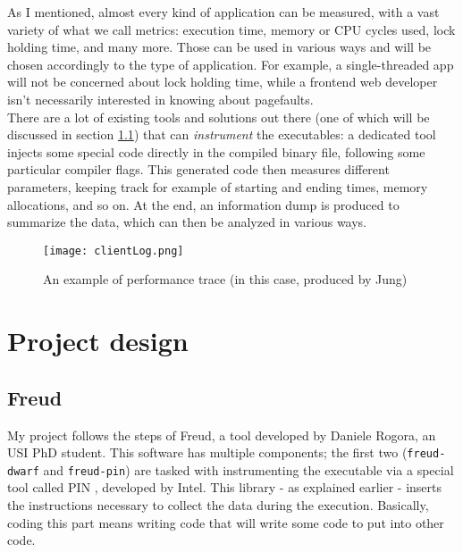     As I mentioned, almost every kind of application can be measured, with a vast variety of what we call metrics:
    execution time, memory or CPU cycles used, lock holding time, and many more. Those can be used in
    various ways and will be chosen accordingly to the type of application. For example, a single-threaded app
    will not be concerned about lock holding time, while a frontend web developer isn't 
    necessarily interested in knowing about pagefaults.\\

    There are a lot of existing tools and solutions out there (one of which will be discussed in section \ref{sec:freud})
    that can \textit{instrument} the executables: a dedicated tool injects some special code directly in the compiled
    binary file, following some particular compiler flags. This generated code then measures
    different parameters, keeping track for example of starting and ending times, memory allocations, and so on.
    At the end, an information dump is produced to summarize the data, which can then be analyzed in various ways.\\

    \begin{figure}[H]
        \centering
        \texttt{[image: clientLog.png]}
        \caption{An example of performance trace (in this case, produced by Jung)}
        \label{fig:clientLog}
    \end{figure}


\chapter{Project design}

    \section{Freud}\label{sec:freud}


        My project follows the steps of Freud, a tool developed by Daniele Rogora, an USI PhD student.
        This software has multiple components; the first two (\texttt{freud-dwarf} and \texttt{freud-pin})
        are tasked with instrumenting the executable 
        via a special tool called PIN \cite{pin}, developed by Intel. This library - as explained earlier - 
        inserts the instructions necessary to collect the data during the execution. Basically, coding this
        part means writing code that will write some code to put into other code.\\

